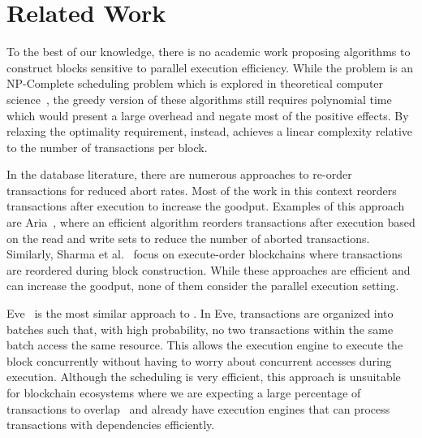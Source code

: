\section{Related Work}
\label{sec:relatedwork}

To the best of our knowledge, there is no academic work proposing algorithms to construct blocks sensitive to parallel execution efficiency. 
While the problem is an NP-Complete scheduling problem which is explored in theoretical computer science~\cite{BAKER1996225}, the greedy version of these algorithms still requires polynomial time which would present a large overhead and negate most of the positive effects.
By relaxing the optimality requirement, instead, \sys achieves a linear complexity relative to the number of transactions per block.

In the database literature, there are numerous approaches to re-order transactions for reduced abort rates.
Most of the work in this context reorders transactions after execution to increase the goodput. Examples of this approach are Aria~\cite{aria}, where an efficient algorithm reorders transactions after execution based on the read and write sets to reduce the number of aborted transactions. Similarly, Sharma et al.~\cite{blurring} focus on execute-order blockchains where transactions are reordered during block construction.
While these approaches are efficient and can increase the goodput, none of them consider the parallel execution setting.

Eve~\cite{eve} is the most similar approach to \sys. In Eve, transactions are organized into batches such that, with high probability, no two transactions within the same batch access the same resource. This allows the execution engine to execute the block concurrently without having to worry about concurrent accesses during execution. Although the scheduling is very efficient, this approach is unsuitable for blockchain ecosystems where we are expecting a large percentage of transactions to overlap~\cite{chiron} and already have execution engines that can process transactions with dependencies efficiently.

